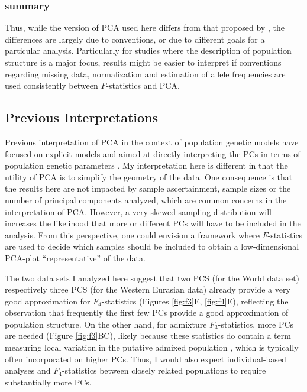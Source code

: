 \documentclass[12pt,fullpage, a4paper]{article}
\begin{document}
\subsubsection{summary}
Thus, while the version of PCA used here differs from that proposed by \cite{patterson2012}, the differences are largely due to conventions, or due to different goals for a particular analysis. Particularly for studies where the description of population structure is a major focus, results might be easier to interpret if  conventions regarding missing data, normalization and estimation of allele frequencies are used consistently between $F$-statistics and PCA.

\subsection{Previous Interpretations}
Previous interpretation of PCA in the context of population genetic models have focused on explicit models and aimed at directly interpreting the PCs in terms of population genetic parameters \citep{cavalli-sforza1975, novembre2008a, francois2021}. My interpretation here is different in that the utility of PCA is to simplify the geometry of the data. One consequence is that the results here are not impacted by sample ascertainment, sample sizes or the number of principal components analyzed, which are common concerns in the interpretation of PCA. However, a very skewed sampling distribution will increases the likelihood that more or different PCs will have to be included in the analysis. From this perspective, one could envision a framework where $F$-statistics are used to decide which samples should be included to obtain a low-dimensional PCA-plot ``representative'' of the data.

The two data sets I analyzed here suggest that two PCS (for the World data set) respectively three PCS (for the Western Eurasian data) already provide a very good approximation for $F_4$-statistics (Figures \ref{fig:f3}E, \ref{fig:f4}E), reflecting the observation that frequently the first few PCs provide a good approximation of population structure. On the other hand, for admixture $F_3$-statistics, more PCs are needed (Figure \ref{fig:f3}BC), likely because these statistics do contain a term measuring local variation in the putative admixed population \citep{peter2016}, which is typically often incorporated on higher PCs. Thus, I would also expect individual-based analyses and $F_4$-statistics between closely related populations to require substantially more PCs.
\end{document}
